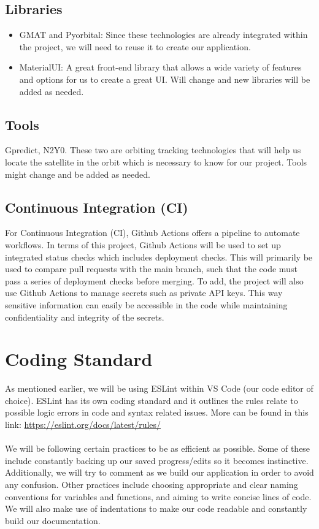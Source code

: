 \documentclass{article}
\begin{document}
\subsection{Libraries}
\begin{itemize}
    \item GMAT and Pyorbital: Since these technologies are already integrated within the project, we will need to reuse it to create our application.  
    \item MaterialUI: A great front-end library that allows a wide variety of features and options for us to create a great UI. Will change and new libraries will be added as needed. 
\end{itemize}

\subsection{Tools}
Gpredict, N2Y0. These two are orbiting
tracking technologies that will help us locate the satellite in the orbit
which is necessary to know for our project. Tools might change and be
added as needed.

\subsection{Continuous Integration (CI)}
For Continuous Integration (CI), Github Actions offers a pipeline to automate workflows. In terms of this project, Github Actions will be used to set up integrated status checks which includes deployment checks. This will primarily be used to compare pull requests with the main branch, such that the code must pass a series of deployment checks before merging. To add, the project will also use Github Actions to manage secrets such as private API keys. This way sensitive information can easily be accessible in the code while maintaining confidentiality and integrity of the secrets.

\section{Coding Standard}
As mentioned earlier, we will be using ESLint within VS Code (our code editor of choice). ESLint has its own coding standard and it outlines the rules relate to possible logic errors in code and syntax related issues. More can be found in this link: \url{https://eslint.org/docs/latest/rules/}
\\ \\
We will be following certain practices to be as efficient as possible. Some of these include constantly backing up our saved progress/edits so it becomes instinctive. Additionally, we will try to comment as we build our application in order to avoid any confusion. Other practices include choosing appropriate and clear naming conventions for variables and functions, and aiming to write concise lines of code. We will also make use of indentations to make our code readable and constantly build our documentation. 
\end{document}

